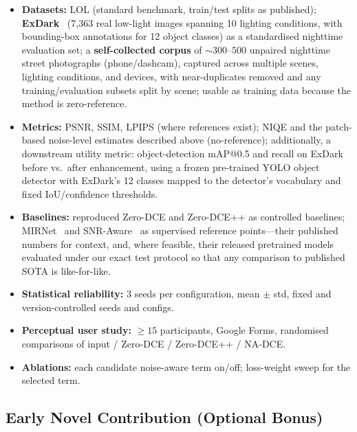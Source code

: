 \documentclass[11pt, letterpaper]{article}
\begin{document}
\begin{itemize}[noitemsep]
  \item \textbf{Datasets:} LOL (standard benchmark, train/test splits as published); \textbf{ExDark}~\cite{loh2019getting} (7{,}363 real low-light images spanning 10 lighting conditions, with bounding-box annotations for 12 object classes) as a standardised nighttime evaluation set; a \textbf{self-collected corpus} of ${\sim}300$--$500$ unpaired nighttime street photographs (phone/dashcam), captured across multiple scenes, lighting conditions, and devices, with near-duplicates removed and any training/evaluation subsets split by scene; usable as training data because the method is zero-reference.
  \item \textbf{Metrics:} PSNR, SSIM, LPIPS (where references exist); NIQE and the patch-based noise-level estimates described above (no-reference); additionally, a downstream utility metric: object-detection mAP@0.5 and recall on ExDark before vs.\ after enhancement, using a frozen pre-trained YOLO object detector with ExDark's 12 classes mapped to the detector's vocabulary and fixed IoU/confidence thresholds.
  \item \textbf{Baselines:} reproduced Zero-DCE and Zero-DCE++ as controlled baselines; MIRNet~\cite{zamir2020learning} and SNR-Aware~\cite{xu2022snr} as supervised reference points---their published numbers for context, and, where feasible, their released pretrained models evaluated under our exact test protocol so that any comparison to published SOTA is like-for-like.
  \item \textbf{Statistical reliability:} 3 seeds per configuration, mean $\pm$ std, fixed and version-controlled seeds and configs.
  \item \textbf{Perceptual user study:} $\geq 15$ participants, Google Forms, randomised comparisons of input / Zero-DCE / Zero-DCE++ / NA-DCE.
  \item \textbf{Ablations:} each candidate noise-aware term on/off; loss-weight sweep for the selected term.
\end{itemize}

\subsection{Early Novel Contribution (Optional Bonus)}
\end{document}
